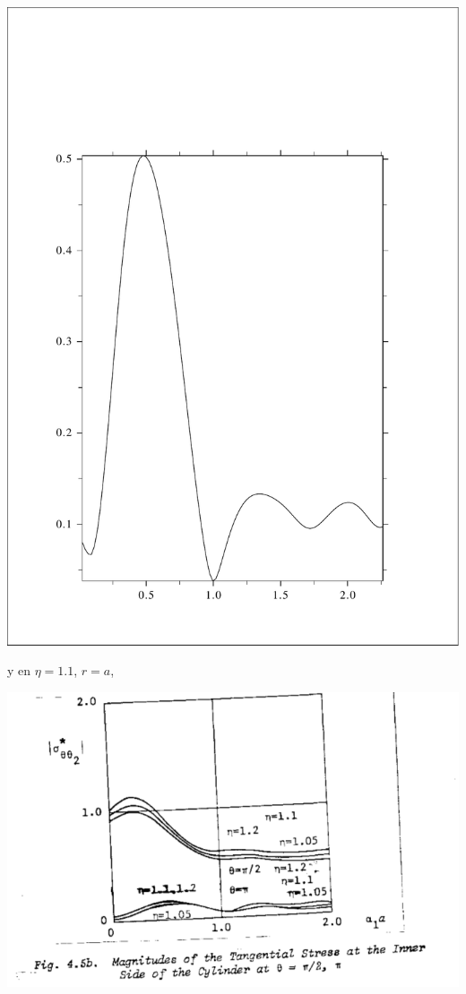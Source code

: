 \documentclass [11pt,spanish]{article}
\begin{document}
\includegraphics[scale=0.4]{RES_1s_tt1abspi.pdf}

y en $\eta=1.1$, $r=a$, 

\includegraphics[scale=0.4]{res2}
\end{document}
